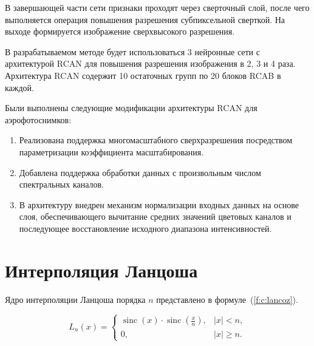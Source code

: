 В завершающей части сети признаки проходят через сверточный слой, после чего выполняется операция повышения разрешения субпиксельной сверткой. На выходе формируется изображение сверхвысокого разрешения.

В разрабатываемом методе будет использоваться 3 нейронные сети с архитектурой RCAN для повышения разрешения изображения в 2, 3 и 4 раза. Архитектура RCAN содержит 10 остаточных групп по 20 блоков RCAB в каждой.

Были выполнены следующие модификации архитектуры RCAN для  аэрофотоснимков:
\begin{enumerate}
    \item Реализована поддержка многомасштабного сверхразрешения посредством параметризации коэффициента масштабирования.
    
    \item Добавлена поддержка обработки данных с произвольным числом спектральных каналов.
    
    \item В архитектуру внедрен механизм нормализации входных данных на основе слоя, обеспечивающего вычитание средних значений цветовых каналов и последующее восстановление исходного диапазона интенсивностей.
\end{enumerate}




\section{Интерполяция Ланцоша}

Ядро интерполяции Ланцоша порядка $n$ представлено в формуле~(\ref{f:c:lancoz}).

\begin{equation}
    L_n(x) = \begin{cases}
    \operatorname{sinc}(x) \cdot \operatorname{sinc}\left(\frac{x}{n}\right), & |x| < n, \\
    0, & |x| \geqslant n.
    \end{cases}
    \label{f:c:lancoz}
\end{equation}


